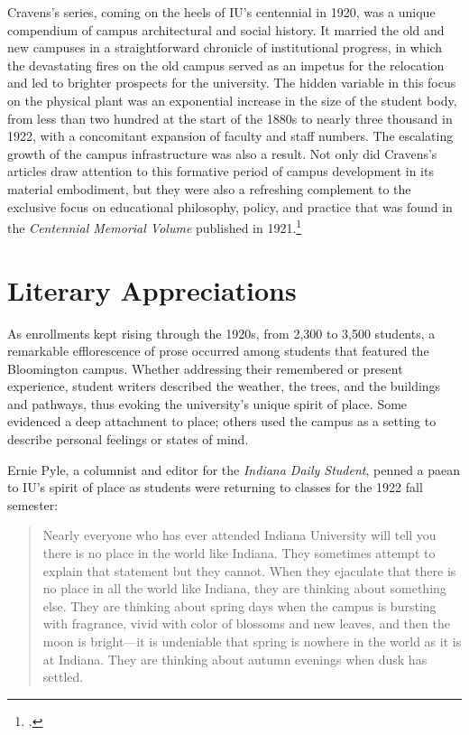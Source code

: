\documentclass[
  american,
  letterpaper,
]{scrreprt}
\begin{document}
Cravens's series, coming on the heels of IU's centennial in 1920, was a
unique compendium of campus architectural and social history. It married
the old and new campuses in a straightforward chronicle of institutional
progress, in which the devastating fires on the old campus served as an
impetus for the relocation and led to brighter prospects for the
university. The hidden variable in this focus on the physical plant was
an exponential increase in the size of the student body, from less than
two hundred at the start of the 1880s to nearly three thousand in 1922,
with a concomitant expansion of faculty and staff numbers. The
escalating growth of the campus infrastructure was also a result. Not
only did Cravens's articles draw attention to this formative period of
campus development in its material embodiment, but they were also a
refreshing complement to the exclusive focus on educational philosophy,
policy, and practice that was found in the \emph{Centennial Memorial
Volume} published in 1921.\footnote{.}

\section{Literary Appreciations}\label{literary-appreciations}

As enrollments kept rising through the 1920s, from 2,300 to 3,500
students, a remarkable efflorescence of prose occurred among students
that featured the Bloomington campus. Whether addressing their
remembered or present experience, student writers described the weather,
the trees, and the buildings and pathways, thus evoking the university's
unique spirit of place. Some evidenced a deep attachment to place;
others used the campus as a setting to describe personal feelings or
states of mind.

Ernie Pyle, a columnist and editor for the \emph{Indiana Daily Student},
penned a paean to IU's spirit of place as students were returning to
classes for the 1922 fall semester:

\begin{quote}
Nearly everyone who has ever attended Indiana University will tell you
there is no place in the world like Indiana. They sometimes attempt to
explain that statement but they cannot. When they ejaculate that there
is no place in all the world like Indiana, they are thinking about
something else. They are thinking about spring days when the campus is
bursting with fragrance, vivid with color of blossoms and new leaves,
and then the moon is bright---it is undeniable that spring is nowhere in
the world as it is at Indiana. They are thinking about autumn evenings
when dusk has settled.
\end{quote}
\end{document}
